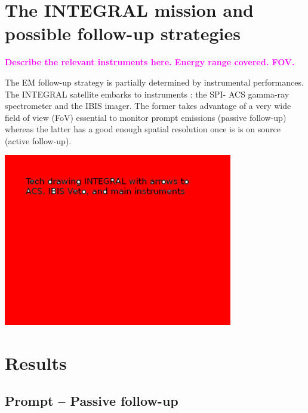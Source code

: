 \documentclass[a0,portrait]{a0poster}
\newcommand{\ECM}[1] {\textbf{\textcolor{magenta}{#1}}}
\begin{document}
\begin{multicols}{2}
\section*{The INTEGRAL mission and possible follow-up strategies}

\ECM{Describe the relevant instruments here. Energy range covered. FOV.}

The EM follow-up strategy is partially determined by instrumental
performances. The INTEGRAL satellite embarks to instruments : the SPI- ACS
gamma-ray spectrometer and the IBIS imager. The former takes advantage of a very
wide field of view (FoV) essential to monitor prompt emissions (passive
follow-up) whereas the latter has a good enough spatial resolution once is is on
source (active follow-up).


\begin{center}
    \includegraphics[width=10cm]{figures/INTEGRAL.png}
\end{center}


\section*{Results}

\subsection*{Prompt -- Passive follow-up}


\end{multicols}
\end{document}
